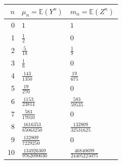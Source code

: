 \begin{tabular}{@{}rll@{}}
\toprule
$n$ & $\mu_n=\mathbb E(Y^n)$ & $m_n=\mathbb E(Z^n)$ \\
\midrule
0 & $1$ & $1$ \\
1 & $\frac{1}{2}$ & $0$ \\
2 & $\frac{5}{18}$ & $\frac{1}{9}$ \\
3 & $\frac{1}{6}$ & $0$ \\
4 & $\frac{143}{1350}$ & $\frac{19}{675}$ \\
5 & $\frac{19}{270}$ & $0$ \\
6 & $\frac{1153}{23814}$ & $\frac{583}{59535}$ \\
7 & $\frac{583}{17010}$ & $0$ \\
8 & $\frac{1616353}{65063250}$ & $\frac{132809}{32531625}$ \\
9 & $\frac{132809}{7229250}$ & $0$ \\
10 & $\frac{134926369}{9762090030}$ & $\frac{46840699}{24405225075}$ \\
\bottomrule
\end{tabular}
